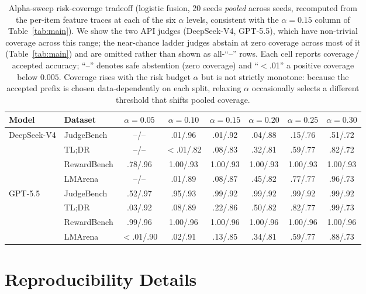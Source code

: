 \begin{table}[t]
\centering
\small
\caption{Alpha-sweep risk-coverage tradeoff (logistic fusion, 20 seeds \emph{pooled} across seeds, recomputed from the per-item feature traces at each of the six $\alpha$ levels, consistent with the $\alpha{=}0.15$ column of Table~\ref{tab:main}). We show the two API judges (DeepSeek-V4, GPT-5.5), which have non-trivial coverage across this range; the near-chance ladder judges abstain at zero coverage across most of it (Table~\ref{tab:main}) and are omitted rather than shown as all-``--'' rows. Each cell reports coverage\,/\,accepted accuracy; ``--'' denotes safe abstention (zero coverage) and ``$<$.01'' a positive coverage below $0.005$. Coverage rises with the risk budget $\alpha$ but is not strictly monotone: because the accepted prefix is chosen data-dependently on each split, relaxing $\alpha$ occasionally selects a different threshold that shifts pooled coverage.}
\label{tab:alpha}
\begin{tabular}{llcccccc}
\toprule
Model & Dataset & $\alpha{=}0.05$ & $\alpha{=}0.10$ & $\alpha{=}0.15$ & $\alpha{=}0.20$ & $\alpha{=}0.25$ & $\alpha{=}0.30$ \\
\midrule
\multirow{4}{*}{DeepSeek-V4} & JudgeBench & --/-- & .01/.96 & .01/.92 & .04/.88 & .15/.76 & .51/.72 \\
 & TL;DR & --/-- & $<$.01/.82 & .08/.83 & .32/.81 & .59/.77 & .82/.72 \\
 & RewardBench & .78/.96 & 1.00/.93 & 1.00/.93 & 1.00/.93 & 1.00/.93 & 1.00/.93 \\
 & LMArena & --/-- & .01/.89 & .08/.87 & .45/.82 & .77/.77 & .96/.73 \\
\midrule
\multirow{4}{*}{GPT-5.5} & JudgeBench & .52/.97 & .95/.93 & .99/.92 & .99/.92 & .99/.92 & .99/.92 \\
 & TL;DR & .03/.92 & .08/.89 & .22/.86 & .50/.82 & .82/.77 & .99/.73 \\
 & RewardBench & .99/.96 & 1.00/.96 & 1.00/.96 & 1.00/.96 & 1.00/.96 & 1.00/.96 \\
 & LMArena & $<$.01/.90 & .02/.91 & .13/.85 & .34/.81 & .59/.77 & .88/.73 \\
\bottomrule
\end{tabular}
\end{table}

\section{Reproducibility Details}
\label{app:repro}

